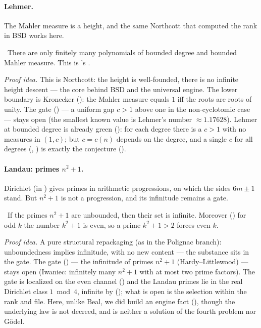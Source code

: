 \paragraph{Lehmer.}
The Mahler measure is a height, and the same Northcott that computed the rank in BSD works here.

\begin{theorem}\label{thm:mahler_northcott_shadow}
\green{}\ There are only finitely many polynomials of bounded degree and bounded Mahler measure. This
is 's . 
\end{theorem}

\emph{Proof idea.} This is Northcott: the height is well-founded, there is no infinite height
descent --- the core behind BSD and the universal engine. The lower boundary is Kronecker
(): the Mahler measure equals $1$ iff the roots are roots of unity. The
gate  (\red{}) --- a uniform gap $c>1$ above one in the non-cyclotomic case
--- stays open (the smallest known value is Lehmer's number $\approx 1.17628$). Lehmer at bounded
degree is already green (): for each degree there is a $c>1$ with
no measures in $(1,c)$; but $c=c(n)$ depends on the degree, and a single $c$ for all degrees
(, \red{}) is exactly the conjecture
().

\paragraph{Landau: primes $n^2+1$.}
Dirichlet (in ) gives primes in arithmetic progressions, on which the sides $6m\pm1$
stand. But $n^2+1$ is not a progression, and its infinitude remains a gate.

\begin{theorem}\label{thm:landauPrimes_infinite_of_unbounded}
\green{}\ If the primes $n^2+1$ are unbounded, then their set is infinite. Moreover
() for odd $k$ the number $k^2+1$ is even, so a prime $k^2+1>2$ forces
even $k$. 
\end{theorem}

\emph{Proof idea.} A pure structural repackaging (as in the Polignac branch): unboundedness implies
infinitude, with no new content --- the substance sits in the gate. The gate 
(\red{}) --- the infinitude of primes $n^2+1$ (Hardy–Littlewood) --- stays open (Iwaniec: infinitely
many $n^2+1$ with at most two prime factors). The gate is localized on the even channel
() and the Landau primes lie in the real Dirichlet class
$1\bmod 4$, infinite by  (); what is open is
the selection within the rank and file. Here, unlike Beal, we did build an engine fact
(), though the underlying law 
is not decreed, and  is neither a solution of the fourth problem nor
Gödel.


